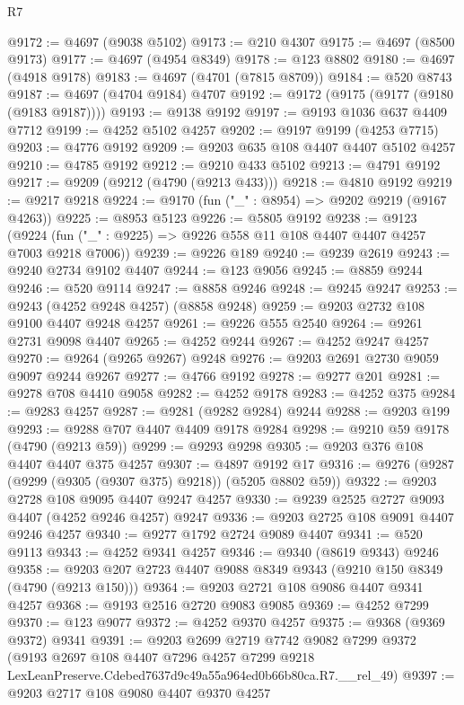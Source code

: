 \begin{lexlean}{R7}
\begin{coremodule}
@9172 := @4697 (@9038 @5102)
@9173 := @210 @4307
@9175 := @4697 (@8500 @9173)
@9177 := @4697 (@4954 @8349)
@9178 := @123 @8802
@9180 := @4697 (@4918 @9178)
@9183 := @4697 (@4701 (@7815 @8709))
@9184 := @520 @8743
@9187 := @4697 (@4704 @9184) @4707
@9192 := @9172 (@9175 (@9177 (@9180 (@9183 @9187))))
@9193 := @9138 @9192
@9197 := @9193 @1036 @637 @4409 @7712
@9199 := @4252 @5102 @4257
@9202 := @9197 @9199 (@4253 @7715)
@9203 := @4776 @9192
@9209 := @9203 @635 @108 @4407 @4407 @5102 @4257
@9210 := @4785 @9192
@9212 := @9210 @433 @5102
@9213 := @4791 @9192
@9217 := @9209 (@9212 (@4790 (@9213 @433)))
@9218 := @4810 @9192
@9219 := @9217 @9218
@9224 := @9170 (fun ("_" : @8954) => @9202 @9219 (@9167 @4263))
@9225 := @8953 @5123
@9226 := @5805 @9192
@9238 := @9123
    (@9224 (fun ("_" : @9225) => @9226 @558 @11 @108 @4407 @4407 @4257 @7003 @9218 @7006))
@9239 := @9226 @189
@9240 := @9239 @2619
@9243 := @9240 @2734 @9102 @4407
@9244 := @123 @9056
@9245 := @8859 @9244
@9246 := @520 @9114
@9247 := @8858 @9246
@9248 := @9245 @9247
@9253 := @9243 (@4252 @9248 @4257) (@8858 @9248)
@9259 := @9203 @2732 @108 @9100 @4407 @9248 @4257
@9261 := @9226 @555 @2540
@9264 := @9261 @2731 @9098 @4407
@9265 := @4252 @9244
@9267 := @4252 @9247 @4257
@9270 := @9264 (@9265 @9267) @9248
@9276 := @9203 @2691 @2730 @9059 @9097 @9244 @9267
@9277 := @4766 @9192
@9278 := @9277 @201
@9281 := @9278 @708 @4410 @9058
@9282 := @4252 @9178
@9283 := @4252 @375
@9284 := @9283 @4257
@9287 := @9281 (@9282 @9284) @9244
@9288 := @9203 @199
@9293 := @9288 @707 @4407 @4409 @9178 @9284
@9298 := @9210 @59 @9178 (@4790 (@9213 @59))
@9299 := @9293 @9298
@9305 := @9203 @376 @108 @4407 @4407 @375 @4257
@9307 := @4897 @9192 @17
@9316 := @9276 (@9287 (@9299 (@9305 (@9307 @375) @9218)) (@5205 @8802 @59))
@9322 := @9203 @2728 @108 @9095 @4407 @9247 @4257
@9330 := @9239 @2525 @2727 @9093 @4407 (@4252 @9246 @4257) @9247
@9336 := @9203 @2725 @108 @9091 @4407 @9246 @4257
@9340 := @9277 @1792 @2724 @9089 @4407
@9341 := @520 @9113
@9343 := @4252 @9341 @4257
@9346 := @9340 (@8619 @9343) @9246
@9358 := @9203 @207 @2723 @4407 @9088 @8349 @9343 (@9210 @150 @8349 (@4790 (@9213 @150)))
@9364 := @9203 @2721 @108 @9086 @4407 @9341 @4257
@9368 := @9193 @2516 @2720 @9083 @9085
@9369 := @4252 @7299
@9370 := @123 @9077
@9372 := @4252 @9370 @4257
@9375 := @9368 (@9369 @9372) @9341
@9391 := @9203
    @2699
    @2719
    @7742
    @9082
    @7299
    @9372
    (@9193
      @2697
      @108
      @4407
      @7296
      @4257
      @7299
      @9218
      LexLeanPreserve.Cdebed7637d9c49a55a964ed0b66b80ca.R7.__rel_49)
@9397 := @9203 @2717 @108 @9080 @4407 @9370 @4257

\end{coremodule}
\end{lexlean}
